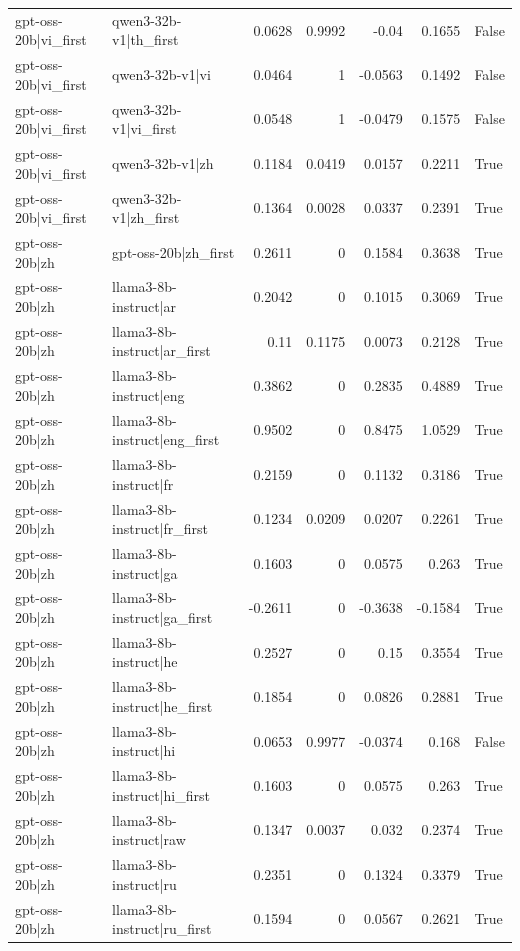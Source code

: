 \begin{table}
\begin{tabular}{l l r r r r l}
gpt-oss-20b|vi_first & qwen3-32b-v1|th_first & 0.0628 & 0.9992 & -0.04 & 0.1655 & False \\
gpt-oss-20b|vi_first & qwen3-32b-v1|vi & 0.0464 & 1 & -0.0563 & 0.1492 & False \\
gpt-oss-20b|vi_first & qwen3-32b-v1|vi_first & 0.0548 & 1 & -0.0479 & 0.1575 & False \\
gpt-oss-20b|vi_first & qwen3-32b-v1|zh & 0.1184 & 0.0419 & 0.0157 & 0.2211 & True \\
gpt-oss-20b|vi_first & qwen3-32b-v1|zh_first & 0.1364 & 0.0028 & 0.0337 & 0.2391 & True \\
gpt-oss-20b|zh & gpt-oss-20b|zh_first & 0.2611 & 0 & 0.1584 & 0.3638 & True \\
gpt-oss-20b|zh & llama3-8b-instruct|ar & 0.2042 & 0 & 0.1015 & 0.3069 & True \\
gpt-oss-20b|zh & llama3-8b-instruct|ar_first & 0.11 & 0.1175 & 0.0073 & 0.2128 & True \\
gpt-oss-20b|zh & llama3-8b-instruct|eng & 0.3862 & 0 & 0.2835 & 0.4889 & True \\
gpt-oss-20b|zh & llama3-8b-instruct|eng_first & 0.9502 & 0 & 0.8475 & 1.0529 & True \\
gpt-oss-20b|zh & llama3-8b-instruct|fr & 0.2159 & 0 & 0.1132 & 0.3186 & True \\
gpt-oss-20b|zh & llama3-8b-instruct|fr_first & 0.1234 & 0.0209 & 0.0207 & 0.2261 & True \\
gpt-oss-20b|zh & llama3-8b-instruct|ga & 0.1603 & 0 & 0.0575 & 0.263 & True \\
gpt-oss-20b|zh & llama3-8b-instruct|ga_first & -0.2611 & 0 & -0.3638 & -0.1584 & True \\
gpt-oss-20b|zh & llama3-8b-instruct|he & 0.2527 & 0 & 0.15 & 0.3554 & True \\
gpt-oss-20b|zh & llama3-8b-instruct|he_first & 0.1854 & 0 & 0.0826 & 0.2881 & True \\
gpt-oss-20b|zh & llama3-8b-instruct|hi & 0.0653 & 0.9977 & -0.0374 & 0.168 & False \\
gpt-oss-20b|zh & llama3-8b-instruct|hi_first & 0.1603 & 0 & 0.0575 & 0.263 & True \\
gpt-oss-20b|zh & llama3-8b-instruct|raw & 0.1347 & 0.0037 & 0.032 & 0.2374 & True \\
gpt-oss-20b|zh & llama3-8b-instruct|ru & 0.2351 & 0 & 0.1324 & 0.3379 & True \\
gpt-oss-20b|zh & llama3-8b-instruct|ru_first & 0.1594 & 0 & 0.0567 & 0.2621 & True \\

\end{tabular}
\end{table}
